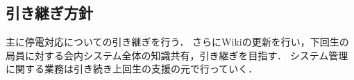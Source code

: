 \subsection*{引き継ぎ方針}

主に停電対応についての引き継ぎを行う．
さらにWikiの更新を行い，下回生の局員に対する会内システム全体の知識共有，引き継ぎを目指す．
システム管理に関する業務は引き続き上回生の支援の元で行っていく．




